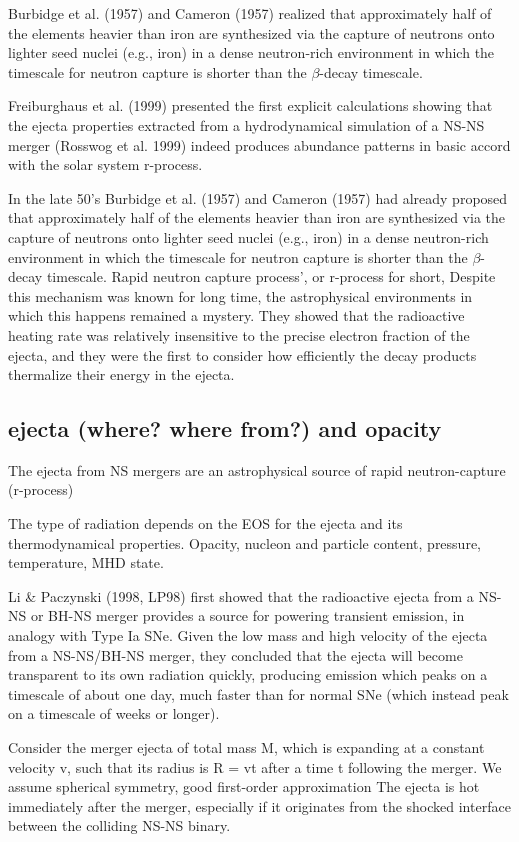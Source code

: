 Burbidge et al. (1957) and Cameron (1957) realized that approximately half of the elements heavier than iron are synthesized via the capture of neutrons onto lighter seed nuclei (e.g., iron) in a dense neutron-rich environment in which the timescale for neutron capture is shorter than the $\beta$-decay timescale.

Freiburghaus et al. (1999) presented the first explicit calculations showing that the ejecta properties extracted from a hydrodynamical simulation of a NS-NS merger (Rosswog et al. 1999) indeed produces abundance patterns in basic accord with the solar system r-process.

In the late 50's Burbidge et al. (1957) and Cameron (1957) had already proposed that approximately half of the elements heavier than iron are synthesized via the capture of neutrons onto lighter seed nuclei (e.g., iron) in a dense neutron-rich environment in which the timescale for neutron capture is shorter than the $\beta$-decay timescale.
Rapid neutron capture process', or r-process for short, 
Despite this mechanism was known for long time, the astrophysical environments in which this happens remained a mystery.
They showed that the radioactive heating rate was relatively insensitive to the precise electron fraction of the ejecta, and they were the first to consider how efficiently the decay products thermalize their energy in the ejecta.

\subsection{ejecta (where? where from?) and opacity}

The ejecta from NS mergers are an astrophysical source of rapid neutron-capture (r-process) 

The type of radiation depends on the EOS for the ejecta and its thermodynamical properties. Opacity, nucleon and particle content, pressure, temperature, MHD state.

Li \& Paczynski (1998, LP98) first showed that the radioactive ejecta from a NS-NS or BH-NS merger provides a source for powering transient emission, in analogy with Type Ia SNe. Given the low mass and high velocity of the ejecta from a NS-NS/BH-NS merger, they concluded that the ejecta will become transparent to its own radiation quickly, producing emission which peaks on a timescale of about one day, much faster than for normal SNe (which instead peak on a timescale of weeks or longer).

Consider the merger ejecta of total mass M, which is expanding at a constant velocity v, such that its radius is R = vt after a time t following the merger. 
We assume spherical symmetry, good first-order approximation
The ejecta is hot immediately after the merger, especially if it originates from the shocked interface between the colliding NS-NS binary. 

